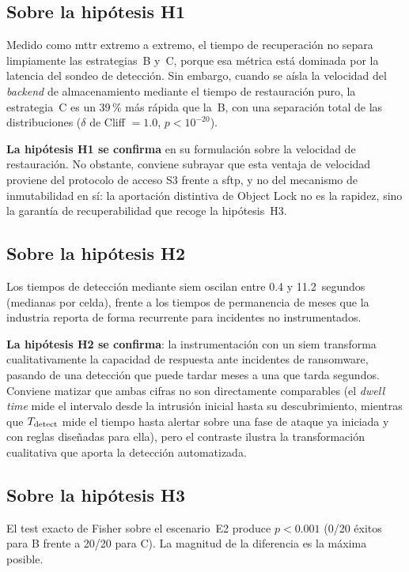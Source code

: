\documentclass[../main.tex]{subfiles}
\begin{document}
\subsection{Sobre la hipótesis H1}

Medido como \gls{mttr} extremo a extremo, el tiempo de recuperación no separa
limpiamente las estrategias~B y~C, porque esa métrica está dominada por la latencia
del sondeo de detección. Sin embargo, cuando se aísla la velocidad del
\emph{backend} de almacenamiento mediante el tiempo de restauración puro, la
estrategia~C es un 39\,\% más rápida que la~B, con una separación total de las
distribuciones ($\delta$ de Cliff $= 1.0$, $p < 10^{-20}$).

\textbf{La hipótesis H1 se confirma} en su formulación sobre la velocidad de
restauración. No obstante, conviene subrayar que esta ventaja de velocidad proviene
del protocolo de acceso S3 frente a \gls{sftp}, y no del mecanismo de inmutabilidad
en sí: la aportación distintiva de Object Lock no es la rapidez, sino la garantía de
recuperabilidad que recoge la hipótesis~H3.

\subsection{Sobre la hipótesis H2}

Los tiempos de detección mediante \gls{siem} oscilan entre 0.4 y 11.2~segundos
(medianas por celda), frente a los tiempos de permanencia de meses que la industria
reporta de forma recurrente para incidentes no instrumentados.

\textbf{La hipótesis H2 se confirma}: la instrumentación con un \gls{siem}
transforma cualitativamente la capacidad de respuesta ante incidentes de ransomware,
pasando de una detección que puede tardar meses a una que tarda segundos. Conviene
matizar que ambas cifras no son directamente comparables (el \emph{dwell time}
mide el intervalo desde la intrusión inicial hasta su descubrimiento, mientras que
$T_{\text{detect}}$ mide el tiempo hasta alertar sobre una fase de ataque ya iniciada y con
reglas diseñadas para ella), pero el contraste ilustra la transformación
cualitativa que aporta la detección automatizada.

\subsection{Sobre la hipótesis H3}

El test exacto de Fisher sobre el escenario~E2 produce $p < 0.001$ (0/20 éxitos
para B frente a 20/20 para C). La magnitud de la diferencia es la máxima posible.
\end{document}
